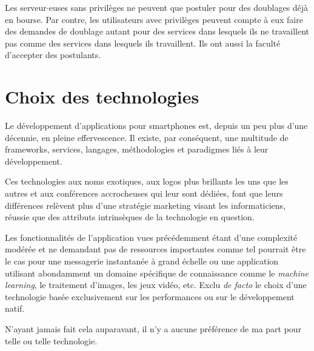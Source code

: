 Les serveur$\cdot$euses sans privilèges ne peuvent que postuler pour des doublages déjà en bourse. Par contre, les utilisateurs avec privilèges peuvent compte à eux faire des demandes de doublage autant pour des services dans lesquels ils ne travaillent pas comme des services dans lesquels ils travaillent. Ils ont aussi la faculté d'accepter des postulants.

\section{Choix des technologies}
Le développement d'applications
pour smartphones est, depuis un peu plus d'une décennie, en pleine effervescence. Il existe, par
conséquent, une multitude de frameworks, services, langages, méthodologies et paradigmes liés à leur
développement.

Ces technologies aux noms exotiques, aux logos plus brillants les uns que les autres et aux
conférences accrocheuses qui leur sont dédiées, font que leurs différences relèvent plus
d'une stratégie marketing visant les informaticiens, réussie que des attributs
intrinsèques de la technologie en question.

Les fonctionnalités de l'application vues précédemment étant d'une complexité modérée et ne demandant pas de ressources importantes
comme tel pourrait être le cas pour une messagerie instantanée à grand échelle ou une application
utilisant abondamment un domaine spécifique de connaissance comme le \textit{machine learning}, le traitement d'images, les jeux vidéo, etc.
Exclu \textit{de facto} le choix d'une technologie basée exclusivement sur les performances ou sur le développement natif.

N'ayant jamais fait cela auparavant, il n'y a aucune préférence de ma part pour telle ou telle technologie.

